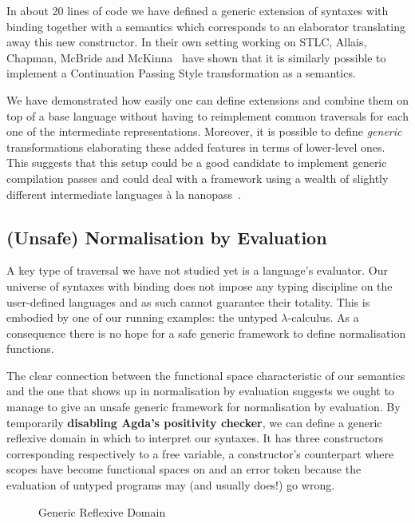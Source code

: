 In about 20 lines of code we have defined a generic extension of
syntaxes with binding together with a semantics which corresponds
to an elaborator translating away this new constructor. In their
own setting working on STLC, Allais, Chapman, McBride
and McKinna~\citeyear{allais2017type} have shown that it is similarly
possible to implement a Continuation Passing Style transformation as
a semantics.

We have demonstrated how easily one can define extensions and combine
them on top of a base language without having to reimplement common
traversals for each one of the intermediate representations. Moreover,
it is possible to define \emph{generic} transformations elaborating
these added features in terms of lower-level ones. This suggests that
this setup could be a good candidate to implement generic compilation
passes and could deal with a framework using a wealth of slightly
different intermediate languages à la nanopass~\cite{Keep:2013:NFC:2544174.2500618}.

\subsection{(Unsafe) Normalisation by Evaluation}

A key type of traversal we have not studied yet is a language's
evaluator. Our universe of syntaxes with binding does not impose
any typing discipline on the user-defined languages and as such
cannot guarantee their totality. This is embodied by one of our running
examples: the untyped $\lambda$-calculus. As a consequence there
is no hope for a safe generic framework to define normalisation
functions.

The clear connection between the  functional space
characteristic of our semantics and the one that shows up in
normalisation by evaluation suggests we ought to manage to
give an unsafe generic framework for normalisation by evaluation.
By temporarily \textbf{disabling Agda's positivity checker},
we can define a generic reflexive domain  in which to
interpret our syntaxes. It has three constructors corresponding
respectively to a free variable, a constructor's counterpart where
scopes have become  functional spaces on  and
an error token because the evaluation of untyped programs may
(and usually does!) go wrong.

\begin{figure}[h]
\caption{Generic Reflexive Domain}
\end{figure}

